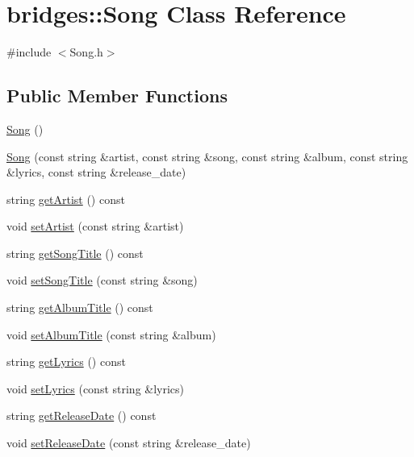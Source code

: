 \hypertarget{classbridges_1_1_song}{}\section{bridges\+:\+:Song Class Reference}
\label{classbridges_1_1_song}


{\ttfamily \#include $<$Song.\+h$>$}

\subsection*{Public Member Functions}
\begin{DoxyCompactItemize}
\item 
\hyperlink{classbridges_1_1_song_aa938ae0bd6d566d6e2a6bf30beeb0ea5}{Song} ()
\item 
\hyperlink{classbridges_1_1_song_a6bba7d1a1ce20a34b30cfa1cd874faa0}{Song} (const string \&artist, const string \&song, const string \&album, const string \&lyrics, const string \&release\+\_\+date)
\item 
string \hyperlink{classbridges_1_1_song_a7accc90f3ae5c82a2b264c14cfc77d4e}{get\+Artist} () const 
\item 
void \hyperlink{classbridges_1_1_song_a21569a1b94eced89eed1a2ab8b2ff1ca}{set\+Artist} (const string \&artist)
\item 
string \hyperlink{classbridges_1_1_song_a3359e4d48d22d0937e8839dcd2be6a2c}{get\+Song\+Title} () const 
\item 
void \hyperlink{classbridges_1_1_song_a18e3a6bd5f424a6dadf529bed446a0d0}{set\+Song\+Title} (const string \&song)
\item 
string \hyperlink{classbridges_1_1_song_a8a19a328a49845693adba066daa3c2cc}{get\+Album\+Title} () const 
\item 
void \hyperlink{classbridges_1_1_song_af89d78b799b672282a60c337327d9988}{set\+Album\+Title} (const string \&album)
\item 
string \hyperlink{classbridges_1_1_song_a4d5ea68a66519410c184f49d5631a1c8}{get\+Lyrics} () const 
\item 
void \hyperlink{classbridges_1_1_song_af32f02057c6dd253ea4e8d002e548cf2}{set\+Lyrics} (const string \&lyrics)
\item 
string \hyperlink{classbridges_1_1_song_a494bb0e17f722f5d2bc4aee75f3941b8}{get\+Release\+Date} () const 
\item 
void \hyperlink{classbridges_1_1_song_a492a14035331c66652488c4f222aa7b3}{set\+Release\+Date} (const string \&release\+\_\+date)
\end{DoxyCompactItemize}


